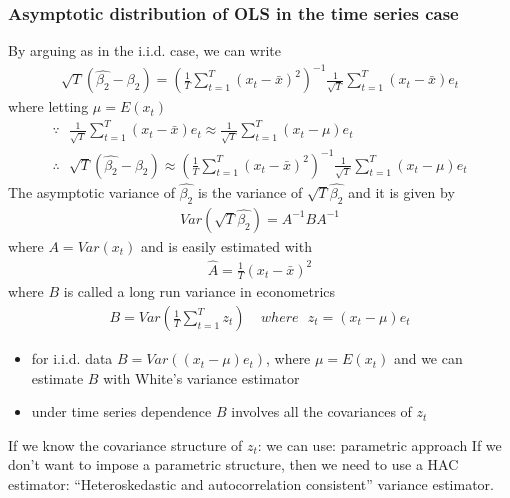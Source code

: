 \documentclass[a4paper,twoside,11pt]{article}
\begin{document}
\subsubsection{Asymptotic distribution of OLS in the time series case}
By arguing as in the i.i.d. case, we can write
\begin{equation*}
\begin{aligned}
\sqrt{T} (\hat{\beta_2} - \beta_2) = (\frac{1}{T} \sum^T_{t=1}(x_t - \bar x)^2)^{-1} \frac{1}{\sqrt{T}}\sum^T_{t=1} (x_t - \bar x)e_t
\end{aligned}
\end{equation*}
where letting $\mu = E(x_t)$
\begin{equation*}
\begin{aligned}
\because \ \ \ \frac{1}{\sqrt{T}} \sum^T_{t=1} (x_t - \bar x)e_t \approx \frac{1}{\sqrt{T}} \sum^T_{t=1} (x_t - \mu)e_t \\
\therefore \ \ \ \sqrt{T} (\hat{\beta_2} - \beta_2) \approx (\frac{1}{T} \sum^T_{t=1}(x_t - \bar x)^2)^{-1} \frac{1}{\sqrt{T}} \sum^T_{t=1} (x_t - \mu)e_t 
\end{aligned}
\end{equation*}
The asymptotic variance of $\hat{\beta_2}$ is the variance of $\sqrt{T} \hat{\beta_2}$ and it is given by 
\begin{equation*}
\begin{aligned}
Var(\sqrt{T} \hat{\beta_2}) = A^{-1} BA^{-1}
\end{aligned}
\end{equation*}
where $A = Var(x_t)$ and is easily estimated with 
\begin{equation*}
\begin{aligned}
\hat{A} = \frac{1}{T} (x_t - \bar x)^2
\end{aligned}
\end{equation*}
where $B$ is called a \textcolor{NavyBlue}{long run variance} in econometrics
\begin{equation*}
\begin{aligned}
B = Var(\frac{1}{T} \sum^T_{t=1} z_t) \ \ \ \ \ where \ \ \ z_t= (x_t - \mu) e_t
\end{aligned}
\end{equation*}
\begin{itemize}
    \item \textcolor{NavyBlue}{for i.i.d. data}
    \newline
    $B = Var((x_t - \mu)e_t)$,  where $\mu=E(x_t)$ and we can estimate $B$ with White's variance estimator
    \item \textcolor{NavyBlue}{under time series dependence}
    \newline
    $B$ involves all the covariances of $z_t$
\end{itemize}
If we know the covariance structure of $z_t$: we can use: parametric approach 
\newline
If we don’t want to impose a parametric structure, then we need to use a HAC estimator: “Heteroskedastic and autocorrelation consistent” variance estimator. 
\end{document}
